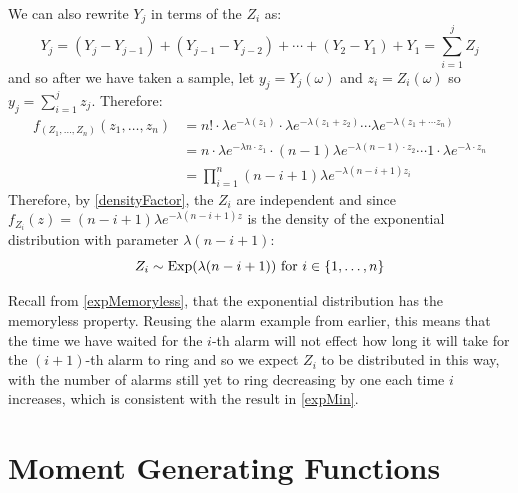 \documentclass[../main.tex]{subfiles}
\begin{document}
We can also rewrite $Y_j$ in terms of the $Z_i$ as:
\[
  Y_j = (Y_{j} - Y_{j - 1}) + (Y_{j - 1} - Y_{j - 2}) + \cdots + (Y_2 - Y_1) + Y_1 = \sum_{i = 1}^{j} Z_j
\]
and so after we have taken a sample, let $y_j = Y_j(\omega)$ and $z_i = Z_i(\omega)$ so $y_j = \sum_{i = 1}^{j} z_j$.
Therefore:
\begin{align*}
  f_{(Z_1, \ldots, Z_n)}(z_1, \ldots, z_n) &= n! \cdot \lambda e^{-\lambda(z_1)} \cdot \lambda e^{-\lambda(z_1 + z_2)} \cdots \lambda e^{-\lambda(z_1 + \cdots z_n)} \\
                                           &= n \cdot \lambda e^{-\lambda n \cdot z_1} \cdot (n - 1) \lambda e^{-\lambda(n - 1) \cdot z_2} \cdots 1 \cdot \lambda e^{-\lambda \cdot z_n} \\
                                           &=\prod_{i = 1}^{n} (n - i + 1) \lambda e^{-\lambda(n - i + 1)z_i}
\end{align*}
Therefore, by \cref{densityFactor}, the $Z_i$ are independent and since $f_{Z_i}(z) = (n - i + 1)\lambda e^{-\lambda(n - i + 1)z}$ is the density of the exponential distribution with parameter $\lambda(n - i + 1)$:
\[
  Z_i \sim \operatorname{Exp}(\lambda(n - i + 1)) \text{ for } i \in \{1, \ldots, n\}
\]
\begin{remark}[Intuition]
  Recall from \cref{expMemoryless}, that the exponential distribution has the memoryless property.
  Reusing the alarm example from earlier, this means that the time we have waited for the $i$-th alarm will not effect how long it will take for the $(i + 1)$-th alarm to ring and so we expect $Z_i$ to be distributed in this way, with the number of alarms still yet to ring decreasing by one each time $i$ increases, which is consistent with the result in \cref{expMin}.
\end{remark}
\section{Moment Generating Functions}
\end{document}
